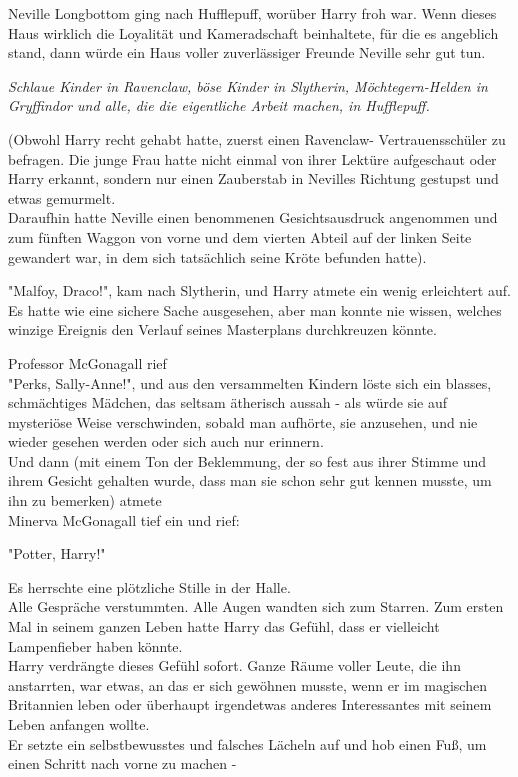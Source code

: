{Neville Longbottom ging nach Hufflepuff, worüber Harry froh war. Wenn dieses Haus wirklich die Loyalität und Kameradschaft beinhaltete, für die es angeblich stand, dann würde ein Haus voller zuverlässiger Freunde Neville sehr gut tun.

\emph{Schlaue Kinder in Ravenclaw, böse Kinder in Slytherin, Möchtegern-Helden in Gryffindor und alle, die die eigentliche Arbeit machen, in Hufflepuff.}

(Obwohl Harry recht gehabt hatte, zuerst einen Ravenclaw- Vertrauensschüler zu befragen. Die junge Frau hatte nicht einmal von ihrer Lektüre aufgeschaut oder Harry erkannt, sondern nur einen Zauberstab in Nevilles Richtung gestupst und etwas gemurmelt.\\ Daraufhin hatte Neville einen benommenen Gesichtsausdruck angenommen und zum fünften Waggon von vorne und dem vierten Abteil auf der linken Seite gewandert war, in dem sich tatsächlich seine Kröte befunden hatte).

"Malfoy, Draco!", kam nach Slytherin, und Harry atmete ein wenig erleichtert auf. Es hatte wie eine sichere Sache ausgesehen, aber man konnte nie wissen, welches winzige Ereignis den Verlauf seines Masterplans durchkreuzen könnte.

Professor McGonagall rief\\ "Perks, Sally-Anne!", und aus den versammelten Kindern löste sich ein blasses, schmächtiges Mädchen, das seltsam ätherisch aussah - als würde sie auf mysteriöse Weise verschwinden, sobald man aufhörte, sie anzusehen, und nie wieder gesehen werden oder sich auch nur erinnern.\\ Und dann (mit einem Ton der Beklemmung, der so fest aus ihrer Stimme und ihrem Gesicht gehalten wurde, dass man sie schon sehr gut kennen musste, um ihn zu bemerken) atmete\\ Minerva McGonagall tief ein und rief:

"Potter, Harry!"

Es herrschte eine plötzliche Stille in der Halle.\\ Alle Gespräche verstummten. Alle Augen wandten sich zum Starren. Zum ersten Mal in seinem ganzen Leben hatte Harry das Gefühl, dass er vielleicht Lampenfieber haben könnte.\\ Harry verdrängte dieses Gefühl sofort. Ganze Räume voller Leute, die ihn anstarrten, war etwas, an das er sich gewöhnen musste, wenn er im magischen Britannien leben oder überhaupt irgendetwas anderes Interessantes mit seinem Leben anfangen wollte.\\ Er setzte ein selbstbewusstes und falsches Lächeln auf und hob einen Fuß, um einen Schritt nach vorne zu machen -

}
